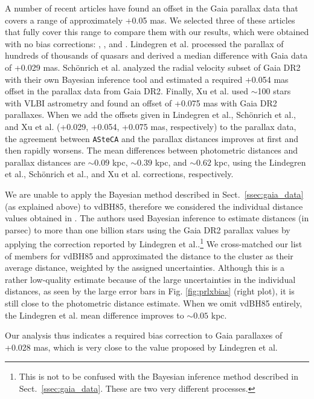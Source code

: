 \documentclass[draft]{aa}
\begin{document}
A number of recent articles have found an offset in the
Gaia parallax data that covers a range of approximately +0.05 mas. We selected
three of these articles that fully cover this range to compare them with our
results, which were obtained with no bias corrections: \cite{Lindegren_2018},
\cite{Schonrich2019}, and \cite{Xu_2019}.
%
Lindegren et al. processed the parallax of hundreds of
thousands of quasars and derived a median difference with Gaia data of +0.029 mas. Sch\"onrich et al. analyzed the radial velocity subset of Gaia
DR2 with their own Bayesian inference tool and estimated a required +0.054 mas
offset in the parallax data from Gaia DR2. Finally, Xu et al. used $\sim$100
stars with VLBI astrometry and found an offset of
+0.075 mas with Gaia DR2 parallaxes. 
%
When we add the offsets given in Lindegren et al., 
Sch\"onrich et al., and Xu et al. (+0.029, +0.054, +0.075 mas,
respectively) to the parallax data, the agreement between \texttt{ASteCA} and the parallax distances
improves at first and then rapidly worsens. The mean differences between photometric
distances and parallax distances are $\sim0.09$ kpc, $\sim0.39$ kpc, and
$\sim0.62$ kpc, using the Lindegren et al., Sch\"onrich et al., and Xu
et al. corrections, respectively.

We are unable to apply the Bayesian method described in
Sect.~\ref{ssec:gaia_data} (as explained above) to vdBH85,
therefore we considered the individual distance values obtained in
\cite{BailerJones_2018}.
The authors used Bayesian inference to estimate distances (in
parsec) to more than one billion stars using the Gaia DR2 parallax values by
applying the correction reported by Lindegren et al..\footnote{This is not to be
confused with the Bayesian inference method described in
Sect.~\ref{ssec:gaia_data}. These are two very different processes.}
We cross-matched our list of members for vdBH85 and approximated the distance to
the cluster as their average distance, weighted by the assigned uncertainties.
Although this is a rather low-quality estimate because of the large
uncertainties in the individual distances, as seen by the large error bars
in Fig. \ref{fig:prlxbias} (right plot), it is still close to the
photometric distance estimate.
When we omit vdBH85 entirely, the Lindegren et al. mean difference improves to
$\sim0.05$ kpc.

Our analysis thus indicates a required bias correction to Gaia parallaxes of
+0.028 mas, which is very close to the value proposed by Lindegren et al.\\
\end{document}
